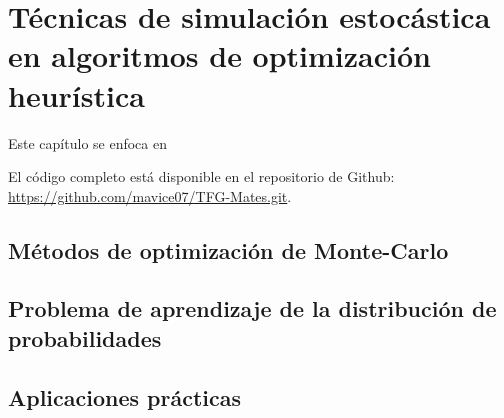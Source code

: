 \chapter{Técnicas de simulación estocástica en algoritmos de optimización heurística} \label{Capitulo 4}
Este capítulo se enfoca en 

El código completo está disponible en el repositorio de Github: \url{https://github.com/mavice07/TFG-Mates.git}.

\section{Métodos de optimización de Monte-Carlo}
\section{Problema de aprendizaje de la distribución de probabilidades}
\section{Aplicaciones prácticas}



